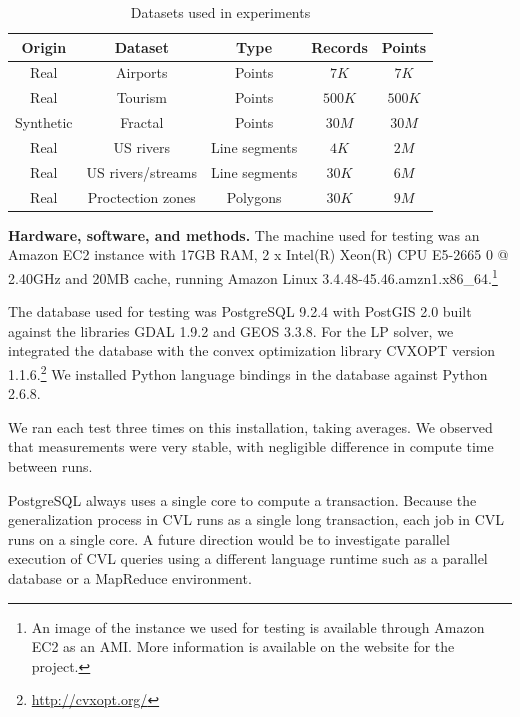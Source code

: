 \documentclass[11pt, oneside]{report}
\newcommand{\minisec}[1]{\noindent\textbf{#1.}}
\begin{document}
\begin{table}[htdp]
\caption{Datasets used in experiments}
\label{tab:cvl:datasets}
\begin{center}
\begin{tabular}{|c|c|c|c|c|}
\hline
\textbf{Origin} & \textbf{Dataset} & \textbf{Type} & \textbf{Records} & \textbf{Points} \\
\hline
Real & Airports & Points & $7K$ & $7K$ \\
Real & Tourism & Points & $500K$ & $500K$ \\
Synthetic & Fractal & Points & $30M$ & $30M$ \\
Real & US rivers & Line segments & $4K$ & $2M$ \\
Real & US rivers/streams & Line segments & $30K$ & $6M$ \\
Real & Proctection zones & Polygons & $30K$ & $9M$ \\
\hline
\end{tabular}
\end{center}
\label{default}
\end{table}%


\minisec{Hardware, software, and methods}
The machine used for testing was an Amazon EC2 instance with 17GB RAM, 2 x Intel(R) Xeon(R) CPU E5-2665 0 @ 2.40GHz and 20MB cache, running Amazon Linux 3.4.48-45.46.amzn1.x86\_64.\footnote{An image of the instance we used for testing is available through Amazon EC2 as an AMI. More information is available on the website for the project.}

The database used for testing was PostgreSQL 9.2.4 with PostGIS  2.0 built against the libraries GDAL 1.9.2 and GEOS 3.3.8. For the LP solver, we integrated the database with the convex optimization library CVXOPT version 1.1.6.\footnote{\url{http://cvxopt.org/}} We installed Python language bindings in the database against Python 2.6.8.

We ran each test three times on this installation, taking averages. We observed that measurements were very stable, with negligible difference in compute time between runs.

PostgreSQL always uses a single core to compute a transaction. Because the generalization process in CVL runs as a single long transaction, each job in CVL runs on a single core. A future direction would be to investigate parallel execution of CVL queries using a different language runtime such as a parallel database or a MapReduce environment.
\end{document}
